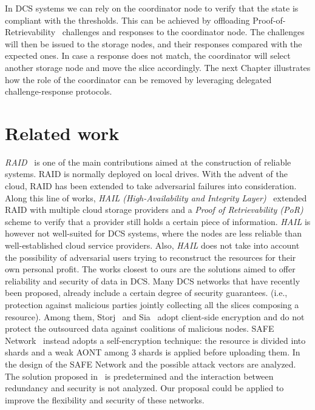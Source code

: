 {In DCS systems we can rely on the coordinator node to verify that the state is compliant with the thresholds. This can be achieved by offloading Proof-of-Retrievability~\cite{bowers2009proofs} challenges and responses to the coordinator node. The challenges will then be issued to the storage nodes, and their responses compared with the expected ones. In case a response does not match, the coordinator will select another storage node and move the slice accordingly.
%
The next Chapter illustrates how the role of the coordinator can be removed by leveraging delegated challenge-response protocols.
}


\section{Related work}\label{dcs:sec:relwork}

{\em RAID}~\cite{Patterson:1988:CRA:971701.50214} is one of the main
contributions aimed at the construction of reliable systems.  RAID is
normally deployed on local drives.  With the advent of the cloud, RAID
has been extended to take adversarial failures into
consideration. Along this line of works, {\em HAIL (High-Availability
  and Integrity Layer)}~\cite{bowers2009hail} extended RAID with
multiple cloud storage providers and a {\em Proof of Retrievability
  (PoR)}~\cite{bowers2009proofs} scheme to verify that a provider
still holds a certain piece of information.  {\em HAIL} is however not
well-suited for DCS systems, where the nodes are less reliable than
well-established cloud service providers. Also, {\em HAIL} does not
take into account the possibility of adversarial users trying to
reconstruct the resources for their own personal profit.  The works
closest to ours are the solutions aimed to offer reliability and
security of data in DCS. Many DCS networks that have recently been
proposed, already include a certain degree of security guarantees.
(i.e., protection against malicious parties jointly collecting all the
slices composing a resource).  Among them,
Storj~\cite{wilkinson2014storj} and Sia~\cite{vorick2014sia} adopt
client-side encryption and do not protect the outsourced data against
coalitions of malicious nodes.  SAFE Network~\cite{irvine2010maidsafe}
instead adopts a self-encryption technique: the resource is divided
into shards and a weak AONT among 3 shards is applied before uploading
them.  In~\cite{paul2014security} the design of the SAFE Network and
the possible attack vectors are analyzed.  The solution proposed
in~\cite{irvine2010maidsafe,paul2014security} is predetermined and the
interaction between redundancy and security is not analyzed.  Our
proposal could be applied to improve the flexibility and security of
these networks.


